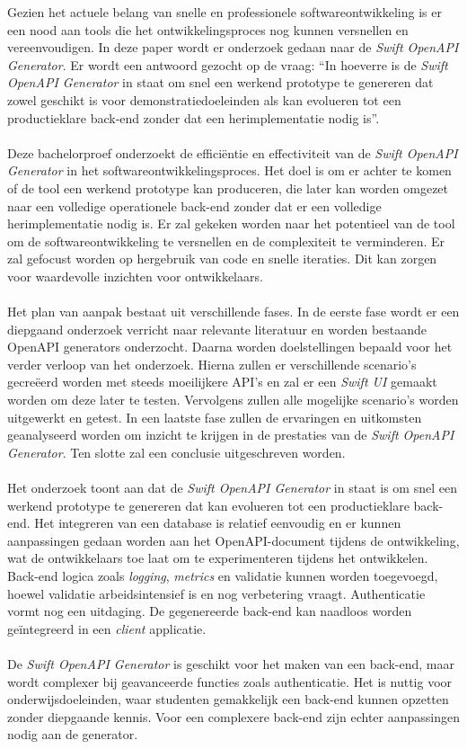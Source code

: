Gezien het actuele belang van snelle en professionele softwareontwikkeling is er een nood aan tools die het ontwikkelingsproces nog kunnen versnellen en vereenvoudigen. In deze paper wordt er onderzoek gedaan naar de \textit{Swift OpenAPI Generator}. Er wordt een antwoord gezocht op de vraag: “In hoeverre is de \textit{Swift OpenAPI Generator} in staat om snel een werkend prototype te genereren dat zowel geschikt is voor demonstratiedoeleinden als kan evolueren tot een productieklare back-end zonder dat een herimplementatie nodig is”.
\\ \\
Deze bachelorproef onderzoekt de efficiëntie en effectiviteit van de  \textit{Swift OpenAPI Generator} in het softwareontwikkelingsproces. Het doel is om er achter te komen of de tool een werkend prototype kan produceren, die later kan worden omgezet naar een volledige operationele back-end zonder dat er een volledige herimplementatie nodig is. Er zal gekeken worden naar het potentieel van de tool om de softwareontwikkeling te versnellen en de complexiteit te verminderen. Er zal gefocust worden op hergebruik van code en snelle iteraties. Dit kan zorgen voor waardevolle inzichten voor ontwikkelaars. 
\\ \\
Het plan van aanpak bestaat uit verschillende fases. In de eerste fase wordt er een diepgaand onderzoek verricht naar relevante literatuur en worden bestaande OpenAPI generators onderzocht. Daarna worden doelstellingen bepaald voor het verder verloop van het onderzoek. Hierna zullen er verschillende scenario’s gecreëerd worden met steeds moeilijkere API’s en zal er een \textit{Swift UI} gemaakt worden om deze later te testen. 
Vervolgens zullen alle mogelijke scenario’s worden uitgewerkt en getest. In een laatste fase zullen de ervaringen en uitkomsten geanalyseerd worden om inzicht te krijgen in de prestaties van de \textit{Swift OpenAPI Generator}. Ten slotte zal een conclusie uitgeschreven worden. 
\\ \\
Het onderzoek toont aan dat de \textit{Swift OpenAPI Generator} in staat is om snel een werkend prototype te genereren dat kan evolueren tot een productieklare back-end. Het integreren van een database is relatief eenvoudig en er kunnen aanpassingen gedaan worden aan het OpenAPI-document tijdens de ontwikkeling, wat de ontwikkelaars toe laat om te experimenteren tijdens het ontwikkelen. 
Back-end logica zoals \textit{logging}, \textit{metrics} en validatie kunnen worden toegevoegd, hoewel validatie arbeidsintensief is en nog verbetering vraagt. Authenticatie vormt nog een uitdaging. De gegenereerde back-end kan naadloos worden geïntegreerd in een \textit{client} applicatie.
\\ \\
De \textit{Swift OpenAPI Generator} is geschikt voor het maken van een back-end, maar wordt complexer bij geavanceerde functies zoals authenticatie. Het is nuttig voor onderwijsdoeleinden, waar studenten gemakkelijk een back-end kunnen opzetten zonder diepgaande kennis. Voor een complexere back-end zijn echter aanpassingen nodig aan de generator.

